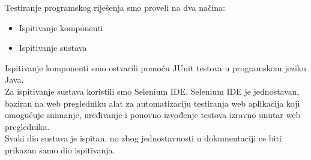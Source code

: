 	Testiranje programskog riješenja smo proveli na dva        načina:
        \begin{itemize}
            \item Ispitivanje komponenti
            \item Ispitivanje sustava
        \end{itemize}
        Ispitivanje komponenti smo ostvarili pomoću JUnit testova u programskom jeziku Java.\\
        Za ispitivanje sustava koristili smo Selenium IDE. Selenium IDE je jednostavan, baziran na web pregledniku alat za automatizaciju testiranja web aplikacija koji omogućuje snimanje, uređivanje i ponovno izvođenje testova izravno unutar web preglednika.\\
        Svaki dio sustava je ispitan, no zbog jednostavnosti u dokumentaciji ce biti prikazan samo dio ispitivanja.

    

			
		
	
			
